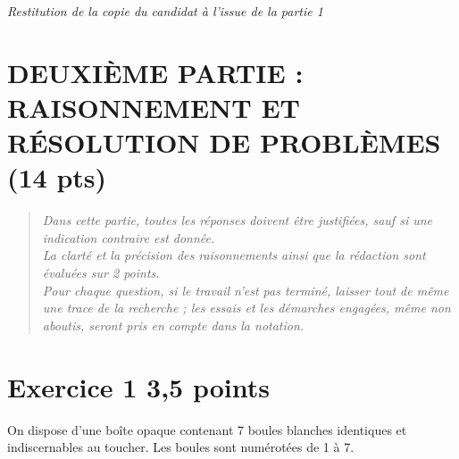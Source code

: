 \documentclass[12pt,a4paper,french]{article}
\begin{document}
\begin{center}
\emph{Restitution de la copie du candidat à l'issue de la partie 1}
\end{center}

\newpage
\section*{\centering DEUXIÈME PARTIE : RAISONNEMENT ET RÉSOLUTION DE PROBLÈMES (14 pts)}

\begin{quote}
\emph{Dans cette partie, toutes les réponses doivent être justifiées, sauf si une indication contraire est donnée.\\
	La clarté et la précision des raisonnements ainsi que la rédaction sont évaluées sur 2 points.\\
	Pour chaque question, si le travail n'est pas terminé, laisser tout de même une trace de la recherche ; les essais et les démarches engagées, même non aboutis, seront pris en compte dans la notation.}
\end{quote}

\section*{Exercice 1 \hfill 3,5 points}

On dispose d'une boîte opaque contenant 7 boules blanches identiques et indiscernables au toucher. Les boules sont numérotées de 1 à 7.
\end{document}
